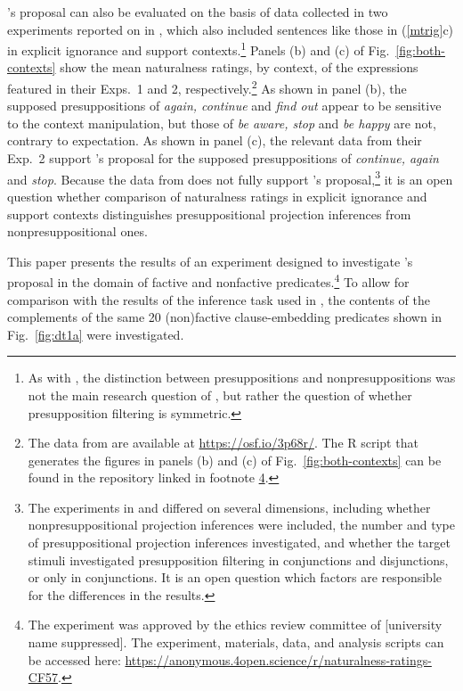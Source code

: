 \documentclass[11pt,fleqn]{article}
\newcommand{\6}{\mbox{$[\hspace*{-.6mm}[$}}
\newcommand{\9}{\mbox{$]\hspace*{-.6mm}]$}}
\newcommand{\citepos}[1]{\citeauthor{#1}'s \citeyear{#1}}
\begin{document}
\citepos{mandelkern-etal2020} proposal can also be evaluated on the basis of data collected in two experiments reported on in \citealt{kalomoiros-schwarz2024}, which also included sentences like those in (\ref{mtrig}c) in explicit ignorance and support contexts.\footnote{As with \citealt{mandelkern-etal2020}, the distinction between presuppositions and nonpresuppositions was not the main research question of \citealt{kalomoiros-schwarz2024}, but rather the question of whether presupposition filtering is symmetric.} Panels (b) and (c) of Fig.~\ref{fig:both-contexts} show the mean naturalness ratings, by context, of the expressions featured in their Exps.~1 and 2, respectively.\footnote{The data from \citealt{kalomoiros-schwarz2024} are available at \url{https://osf.io/3p68r/}. The R script that generates the figures in panels (b) and (c) of Fig.~\ref{fig:both-contexts} can be found in the repository linked in footnote \ref{f:github}.} As shown in panel (b), the supposed presuppositions of \emph{again, continue} and \emph{find out} appear to be sensitive to the context manipulation, but those of \emph{be aware, stop} and \emph{be happy} are not, contrary to expectation. As shown in panel (c), the relevant data from their Exp.~2 support \citepos{mandelkern-etal2020} proposal for the supposed presuppositions of \emph{continue, again} and \emph{stop}. Because the data from \citealt[Exp.~1]{kalomoiros-schwarz2024} does not fully support \citepos{mandelkern-etal2020} proposal,\footnote{The experiments in \citealt{mandelkern-etal2020} and \citealt{kalomoiros-schwarz2024} differed on several dimensions, including whether nonpresuppositional projection inferences were included, the number and type of presuppositional projection inferences investigated, and whether the target stimuli investigated presupposition filtering in conjunctions and disjunctions, or only in conjunctions. It is an open question which factors are responsible for the differences in the results.} it is an open question whether comparison of naturalness ratings in explicit ignorance and support contexts distinguishes presuppositional projection inferences from nonpresuppositional ones.

This paper presents the results of an experiment designed to investigate \citepos{mandelkern-etal2020} proposal in the domain of factive and nonfactive predicates.\footnote{\label{f:github}The experiment was approved by the ethics review committee of [university name suppressed]. The experiment, materials, data, and analysis scripts can be accessed here:  \url{https://anonymous.4open.science/r/naturalness-ratings-CF57}.}  To allow for comparison with the results of the inference task used in \citealt{degen-tonhauser-language},  the contents of the complements of the same 20 (non)factive clause-embedding predicates shown in Fig.~\ref{fig:dt1a} were investigated. 
\end{document}

